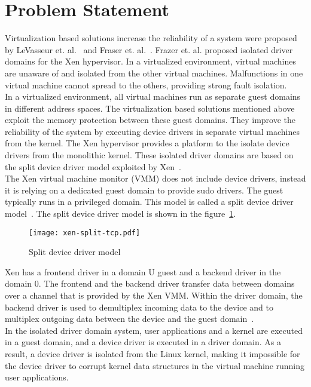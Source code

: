 \section {Problem Statement}
\label{sec:problem}
Virtualization based solutions increase the reliability of a system were proposed by LeVasseur et. al.~\cite{LeVasseur04UnmodifiedDriverReuse} and Fraser et. al.~\cite{Fraser04safehardware}. Frazer et. al. proposed isolated driver domains for the Xen hypervisor. In a virtualized environment, virtual machines are unaware of and isolated from the other virtual machines. Malfunctions in one virtual machine cannot spread to the others, providing strong fault isolation. 
\\[3mm]
In a virtualized environment, all virtual machines run as separate guest domains in different address spaces. The virtualization based solutions mentioned above exploit the memory protection between these guest domains. They improve the reliability of the system by executing device drivers in separate virtual machines from the kernel. The Xen hypervisor provides a platform to the isolate device drivers from the monolithic kernel. These isolated driver domains are based on the split device driver model exploited by Xen~\cite{driverdomain}. 
\\[3mm]
The Xen virtual machine monitor (VMM) does not include device drivers, instead it is relying on a dedicated guest domain to provide sudo drivers. The guest typically runs in a privileged domain. This model is called a split device driver model~\cite{Chisnall:2007:DGX:1407351}. The split device driver model is shown in the figure~\ref{fig:xen-split}.
\begin{figure}[!ht]
\centering
\texttt{[image: xen-split-tcp.pdf]}
\caption{Split device driver model}
\label{fig:xen-split}
\end{figure}
Xen has a frontend driver in a domain U guest and a backend driver in the domain 0. The frontend and the backend driver transfer data between domains over a channel that is provided by the Xen VMM. Within the driver domain, the backend driver is used to demultiplex incoming data to the device and to multiplex outgoing data between the device and the guest domain~\cite{driverdomain}.
\\[3mm]
In the isolated driver domain system, user applications and a kernel are executed in a guest domain, and a device driver is executed in a driver domain. As a result, a device driver is isolated from the Linux kernel, making it impossible for the device driver to corrupt kernel data structures in the virtual machine running user applications. 
